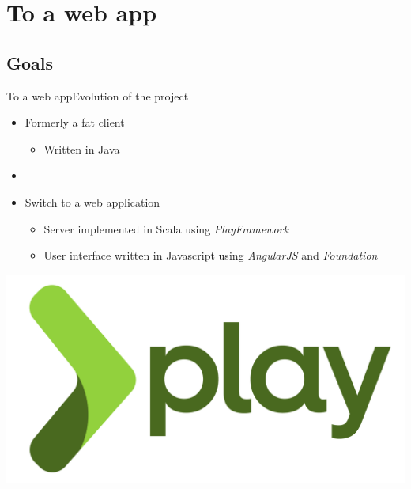 \documentclass{beamer}
\begin{document}
\section{To a web app}

\subsection{Goals}

\begin{frame}{To a web app}{Evolution of the project}
  \begin{itemize}
    \item {
      Formerly a fat client
      \begin{itemize}
        \item { Written in Java }
      \end{itemize}
      \pause
    }
    \item[~]
    \item {
      Switch to a web application
      \begin{itemize}
        \item { Server implemented in Scala using \emph{PlayFramework} }
        \item { User interface written in Javascript using \emph{AngularJS} and \emph{Foundation} }
      \end{itemize}
    }
  \end{itemize}
  \begin{center}
    \includegraphics[scale=0.05]{img/play-logo.png}
    ~

\end{center}
\end{frame}
\end{document}

